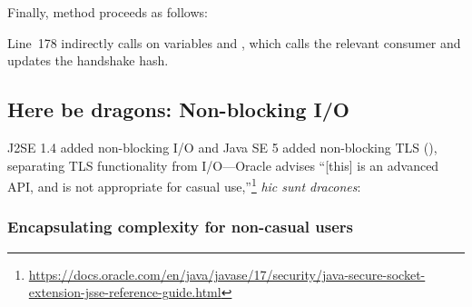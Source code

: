 

\noindent
Finally, method  proceeds as follows:



\begin{sloppypar}
\noindent
Line~178 indirectly calls  on variables
 and , which calls the 
relevant consumer and updates the handshake hash.
\end{sloppypar}


\subsection{Here be dragons: Non-blocking I/O}\label{sec:monkeys:SSLEngine}

J2SE 1.4 added non-blocking I/O and Java SE 5 added non-blocking TLS (), 
separating TLS functionality from I/O---Oracle advises ``[this] is an advanced API, 
and is not appropriate for casual use,''\footnote{\url{https://docs.oracle.com/en/java/javase/17/security/java-secure-socket-extension-jsse-reference-guide.html}} \emph{hic sunt dracones}:


\subsubsection{Encapsulating  complexity for non-casual users}

